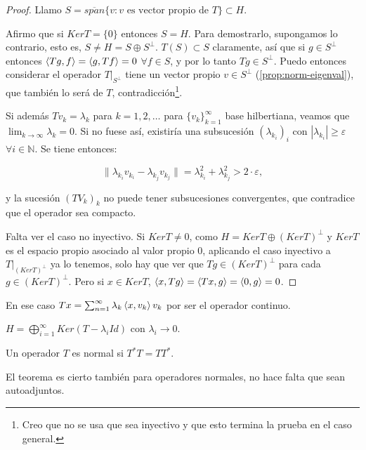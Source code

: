 \begin{proof}
  Llamo $S=\overline{span}\{v:v\text{ es vector propio de } T\}\subset H$.
  
  Afirmo que si $Ker T=\{0\} $ entonces $S=H$. Para demostrarlo, supongamos lo
  contrario, esto es, $S\neq H=S \oplus S^\bot$. $T(S)\subset S$
  claramente, así que si $g\in S^\bot$ entonces $\left\langle Tg,f\right\rangle=\left\langle g,Tf\right\rangle=0$ $\forall
  f\in S$, y por lo tanto $Tg\in S^\bot$. Puedo entonces considerar el operador
   $T|_{S^\bot}$ tiene un vector propio $v\in S^\bot$
   (\ref{prop:norm-eigenval}), que también lo será de $T$,
   contradicción\footnote{Creo que no se usa que sea inyectivo y que esto
   termina la prueba en el caso general.}.
  
  Si además $Tv_k=\lambda_k$ para $k=1,2,\ldots$ para $\{v_k\}_{k=1}^\infty $ 
  base hilbertiana, veamos que $\lim_{k \to \infty} \lambda_k=0$. Si no fuese
  así, existiría una subsucesión $(\lambda_{k_i})_i$ con $|\lambda_{k_i}|\ge
  \varepsilon$ $\forall i \in \mathbb{N}$. Se tiene entonces:

  \[
  \|\lambda_{k_i}v_{k_i}-\lambda_{k_j}v_{k_j}\|
  =\lambda_{k_i}^2+\lambda_{k_j}^2>2\cdot \varepsilon
  ,\] 

  y la sucesión $(TV_{k})_k$ no puede tener subsucesiones convergentes, que
  contradice que el operador sea compacto.

  Falta ver el caso no inyectivo. Si $KerT\neq 0$, como $H=KerT \oplus
  (KerT)^\bot$ y $KerT$ es el espacio propio asociado al valor propio $0$,
  aplicando el caso inyectivo a $T|_{(KerT)^\bot}$ ya lo tenemos, solo hay que
  ver que $Tg\in (KerT)^\bot$ para cada $g\in (KerT)^\bot$. Pero si $x\in KerT$,
  $\left\langle x,Tg\right\rangle=\left\langle Tx,g\right\rangle=\left\langle0,g\right\rangle=0$.
\end{proof}

\begin{remark}
  En ese caso $Tx=\sum_{n=1}^{\infty} \lambda_k\left\langle x,v_k\right\rangle v_k$ por ser el
  operador continuo.
\end{remark}

\begin{remark}
  $H=\bigoplus_{i=1}^\infty Ker(T-\lambda_i Id)$ con $\lambda_i\to 0$.
\end{remark}

\begin{definition}
  Un operador $T$ es normal si $T^*T=TT^*$.
\end{definition}

El teorema es cierto también para operadores normales, no hace falta que sean
autoadjuntos.
